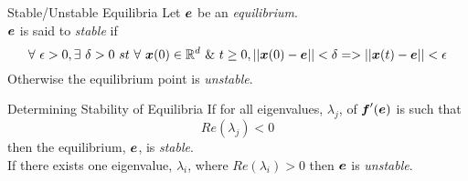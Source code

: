 \documentclass[11pt,a4paper]{article}
\begin{document}
\subtitle{Definition 16.04 - }{Stable/Unstable Equilibria}
Let $\boldsymbol{e}$ be an \textit{equilibrium}.\\
$\boldsymbol{e}$ is said to \textit{stable} if
$$\forall\ \epsilon > 0, \exists\ \delta > 0\ st\ \forall\ \vect{x}(0) \in \real^d\ \&\ t \geq 0, ||\vect{x}(0) - \vect{e}|| < \delta => ||\vect{x}(t) - \vect{e}|| < \epsilon$$
Otherwise the equilibrium point is \textit{unstable}.\\

\subtitle{Theorem 16.05 - }{Determining Stability of Equilibria}
If for all eigenvalues, $\lambda_j$, of $\boldsymbol{f}'(\boldsymbol{e})$ is such that
$$Re(\lambda_j) < 0$$
then the equilibrium, $\boldsymbol{e}$, is \textit{stable}.\\
If there exists one eigenvalue, $\lambda_i$, where $Re(\lambda_i) > 0$ then $\boldsymbol{e}$ is \textit{unstable}.
\end{document}
